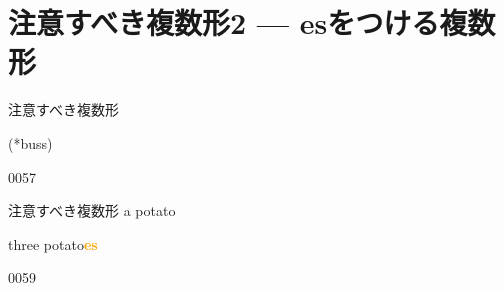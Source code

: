 \documentclass[aspectratio=169,xcolor={dvipsnames,table}]{beamer}
\newcommand{\myaudio}[1]{\href{#1}{\faVolumeUp}}
\begin{document}
\section{注意すべき複数形2 --- esをつける複数形}
\begin{frame}[plain]{注意すべき複数形}

\hspace{15pt}
\pause

\bigskip

\bigskip

\hspace{15pt}
\hfill{}(*buss)

{\tiny 0057}\,{\scriptsize \myaudio{./audio/005_singular_plural_05.mp3}}
\end{frame}
\begin{frame}[plain]{注意すべき複数形}
\hspace{15pt}
\pause
{\LARGE a potato} 
\pause

\bigskip

\bigskip

\hspace{15pt}
\pause
{\LARGE three  potato\textcolor{orange}{\bfseries es}}

{\tiny 0059}\,{\scriptsize \myaudio{./audio/005_singular_plural_06.mp3}}
\end{frame}
\end{document}
